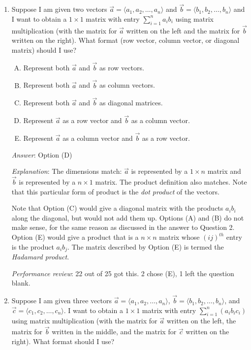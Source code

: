 \documentclass[10pt]{amsart}
\begin{document}
\begin{enumerate}
  {\em Option (B)}: Here, $\vec{a}$ and $\vec{b}$ are both represented
  by $n$-dimensional column vectors, i.e., $n \times 1$ matrices, so
  we cannot multiply them because the number of columns of the first
  matrix does not equal the number of rows of the second matrix.

  {\em Performance review}: 22 out of 25 got this. 3 chose (D).

\item Suppose I am given two vectors $\vec{a} = \langle a_1,
  a_2,\dots,a_n \rangle$ and $\vec{b} = \langle b_1,b_2,\dots,b_n
  \rangle$ and I want to obtain a $1 \times 1$ matrix with entry
  $\sum_{i=1}^n a_ib_i$ using matrix multiplication (with the matrix
  for $\vec{a}$ written on the left and the matrix for $\vec{b}$
  written on the right). What format (row vector, column vector, or
  diagonal matrix) should I use?
  \begin{enumerate}[(A)]
  \item Represent both $\vec{a}$ and $\vec{b}$ as row vectors.
  \item Represent both $\vec{a}$ and $\vec{b}$ as column vectors.
  \item Represent both $\vec{a}$ and $\vec{b}$ as diagonal matrices.
  \item Represent $\vec{a}$ as a row vector and $\vec{b}$ as a column
    vector.
  \item Represent $\vec{a}$ as a column vector and $\vec{b}$ as a row vector.
  \end{enumerate}

  {\em Answer}: Option (D)

  {\em Explanation}: The dimensions match: $\vec{a}$ is represented by
  a $1 \times n$ matrix and $\vec{b}$ is represented by a $n \times 1$
  matrix. The product definition also matches. Note that this
  particular form of product is the {\em dot product} of the vectors.

  Note that Option (C) would give a diagonal matrix with the products
  $a_ib_i$ along the diagonal, but would not add them up. Options (A)
  and (B) do not make sense, for the same reason as discussed in the
  answer to Question 2. Option (E) would give a product that is a $n
  \times n$ matrix whose $(ij)^{th}$ entry is the product
  $a_ib_j$. The matrix described by Option (E) is termed the {\em
    Hadamard product}.

  {\em Performance review}: 22 out of 25 got this.  2 chose (E), 1
  left the question blank.
\item Suppose I am given three vectors $\vec{a} = \langle
  a_1,a_2,\dots,a_n \rangle$, $\vec{b} = \langle b_1,b_2,\dots,b_n
  \rangle$, and $\vec{c} = \langle c_1,c_2,\dots,c_n \rangle$. I want
  to obtain a $1 \times 1$ matrix with entry $\sum_{i=1}^n
  (a_ib_ic_i)$ using matrix multiplication (with the matrix for
  $\vec{a}$ written on the left, the matrix for $\vec{b}$ written in
  the middle, and the matrix for $\vec{c}$ written on the right). What
  format should I use?


\end{enumerate}
\end{document}
